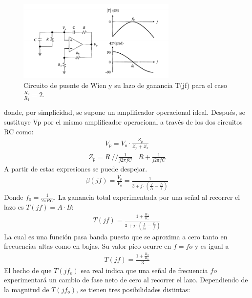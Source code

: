 \begin{figure}[H]
	\centering
	\includegraphics[width=0.7\textwidth]{Imagenes-Ej1/102.png}
	\caption{Circuito de puente de Wien y su lazo de ganancia T(jf) para el caso
	\label{fig:wienbasico}
$\frac{R_2}{R_1} =2$. }
\end{figure}
donde, por simplicidad, se supone un amplificador operacional ideal. Después, se sustituye Vp por el mismo amplificador operacional a través de los dos circuitos RC como:
\begin{align}
V_p= V_o \cdot \frac{Z_p}{Z_p+Z_s}
\end{align}
\begin{align}
Z_p= R \ // \frac{1}{j2\pi f C} \ \ \ \ R + \frac{1}{j2\pi f C} 
\end{align}
A partir de estas expresiones se puede despejar.
\begin{align}
\beta (jf)=\frac{V_p}{V_o}=\frac{1}{3+j\cdot \left( \frac{f}{f_0}-\frac{f_0}{f} \right) }
\end{align}
Donde $f_0 = \frac{1}{2\pi RC}$. La ganancia total experimentada por una señal al recorrer el lazo es
$T(jf)=A \cdot B$:
 \begin{align}
T (jf)=\frac{1+\frac{R_2}{R_1}}{3+j\cdot \left( \frac{f}{f_0}-\frac{f_0}{f} \right) }
\end{align}
La cual es una función pasa banda puesto que se aproxima a cero tanto en frecuencias altas
como en bajas. Su valor pico ocurre en $f= fo$ y es igual a
 \begin{align}
T (jf)=\frac{1+\frac{R_2}{R_1}}{3}
\label{eq:107}
\end{align}
El hecho de que $T(jf_o)$ sea real indica que una señal de frecuencia $fo$ experimentará un
cambio de fase neto de cero al recorrer el lazo. Dependiendo de la magnitud de $T(jf_o)$, se
tienen tres posibilidades distintas: 
